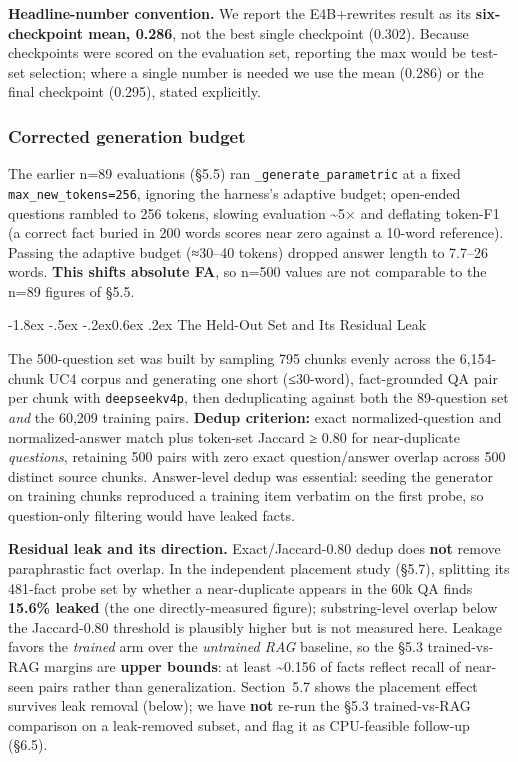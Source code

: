\documentclass[10pt,twocolumn]{article}
\makeatletter
\renewcommand\subsection{\@startsection{subsection}{2}{\z@}%
  {-1.8ex \@plus -.5ex \@minus -.2ex}{0.6ex \@plus .2ex}%
  {\normalfont\normalsize\bfseries}}
\makeatother
\begin{document}
\textbf{Headline-number convention.} We report the E4B+rewrites result as its \textbf{six-checkpoint mean, 0.286}, not the best single checkpoint (0.302). Because checkpoints were scored on the evaluation set, reporting the max would be test-set selection; where a single number is needed we use the mean (0.286) or the final checkpoint (0.295), stated explicitly.

\hypertarget{corrected-generation-budget}{%
\subsubsection{Corrected generation budget}\label{corrected-generation-budget}}

The earlier n=89 evaluations (§5.5) ran \texttt{\_generate\_parametric} at a fixed \texttt{max\_new\_tokens=256}, ignoring the harness's adaptive budget; open-ended questions rambled to 256 tokens, slowing evaluation \textasciitilde5× and deflating token-F1 (a correct fact buried in 200 words scores near zero against a 10-word reference). Passing the adaptive budget (≈30--40 tokens) dropped answer length to 7.7--26 words. \textbf{This shifts absolute FA}, so n=500 values are not comparable to the n=89 figures of §5.5.

\hypertarget{the-held-out-set-and-its-residual-leak}{%
\subsection{The Held-Out Set and Its Residual Leak}\label{the-held-out-set-and-its-residual-leak}}

The 500-question set was built by sampling 795 chunks evenly across the 6,154-chunk UC4 corpus and generating one short (≤30-word), fact-grounded QA pair per chunk with \texttt{deepseekv4p}, then deduplicating against both the 89-question set \emph{and} the 60,209 training pairs. \textbf{Dedup criterion:} exact normalized-question and normalized-answer match plus token-set Jaccard ≥ 0.80 for near-duplicate \emph{questions}, retaining 500 pairs with zero exact question/answer overlap across 500 distinct source chunks. Answer-level dedup was essential: seeding the generator on training chunks reproduced a training item verbatim on the first probe, so question-only filtering would have leaked facts.

\textbf{Residual leak and its direction.} Exact/Jaccard-0.80 dedup does \textbf{not} remove paraphrastic fact overlap. In the independent placement study (§5.7), splitting its 481-fact probe set by whether a near-duplicate appears in the 60k QA finds \textbf{15.6\% leaked} (the one directly-measured figure); substring-level overlap below the Jaccard-0.80 threshold is plausibly higher but is not measured here. Leakage favors the \emph{trained} arm over the \emph{untrained RAG} baseline, so the §5.3 trained-vs-RAG margins are \textbf{upper bounds}: at least \textasciitilde0.156 of facts reflect recall of near-seen pairs rather than generalization. Section~5.7 shows the placement effect survives leak removal (below); we have \textbf{not} re-run the §5.3 trained-vs-RAG comparison on a leak-removed subset, and flag it as CPU-feasible follow-up (§6.5).
\end{document}
